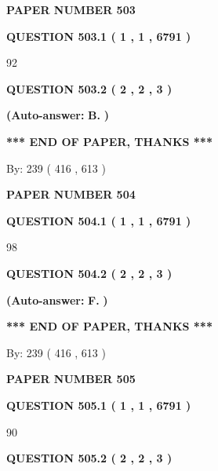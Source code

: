 \documentclass{ctexart}
\begin{document}
   
\newpage 
\setcounter{page}{ 
   503001 } 
   
   
 {\textbf{ \Large{ PAPER NUMBER  503  }}}
   
   
   
   
  
  
{\textbf{\large{QUESTION
503.1 
 ( 1 , 1 , 6791 )
}}}

92
  
  
{\textbf{\large{QUESTION
503.2 
 ( 2 , 2 , 3 )
}}}
 
 
{\textbf{(Auto-answer:}}
{\textbf{\large{
B.}}}
{\textbf{)}}
 
 
   
   
   
   
\vspace{1.0in} 
{\textbf{\large{ *** END OF PAPER, THANKS *** }}} 
   
   
\hspace{1.0in} By: 
 239 ( 416 ,  613 )
   
   
   
   
\newpage 
\setcounter{page}{ 
   504001 } 
   
   
 {\textbf{ \Large{ PAPER NUMBER  504  }}}
   
   
   
   
  
  
{\textbf{\large{QUESTION
504.1 
 ( 1 , 1 , 6791 )
}}}

98
  
  
{\textbf{\large{QUESTION
504.2 
 ( 2 , 2 , 3 )
}}}
 
 
{\textbf{(Auto-answer:}}
{\textbf{\large{
F.}}}
{\textbf{)}}
 
 
   
   
   
   
\vspace{1.0in} 
{\textbf{\large{ *** END OF PAPER, THANKS *** }}} 
   
   
\hspace{1.0in} By: 
 239 ( 416 ,  613 )
   
   
   
   
\newpage 
\setcounter{page}{ 
   505001 } 
   
   
 {\textbf{ \Large{ PAPER NUMBER  505  }}}
   
   
   
   
  
  
{\textbf{\large{QUESTION
505.1 
 ( 1 , 1 , 6791 )
}}}

90
  
  
{\textbf{\large{QUESTION
505.2 
 ( 2 , 2 , 3 )
}}}
 
\end{document}
